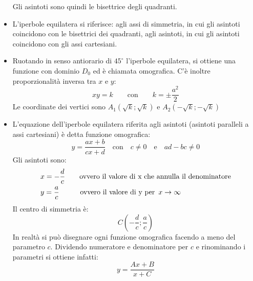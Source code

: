 \documentclass[]{article}
\begin{document}
\begin{itemize}
		Gli asintoti sono quindi le bisettrice degli quadranti.
	\item L'iperbole equilatera si riferisce: agli assi di simmetria, in cui gli asintoti coincidono con le bisettrici dei quadranti, agli asintoti, in cui gli asintoti coincidono con gli assi cartesiani.
	\item Ruotando in senso antiorario di $45^{\circ}$ l'iperbole equilatera, si ottiene una funzione con dominio $D_0$ ed è chiamata omografica. C'è inoltre proporzionalità inversa tra $x$ e $y$:
		$$xy=k \hspace{2em} \text{con} \hspace{2em} k=\pm\frac{a^2}{2}$$
		Le coordinate dei vertici sono $A_1(\sqrt{k};\sqrt{k})$ e $A_2(-\sqrt{k};-\sqrt{k})$
	\item L'equazione dell'iperbole equilatera riferita agli asintoti (asintoti paralleli a assi cartesiani) è detta funzione omografica:
		$$y=\frac{ax+b}{cx+d} \hspace {1em} \text{con} \hspace{1em} c\neq0 \hspace{1em} \text{e} \hspace{1em} ad-bc\neq0$$
		Gli asintoti sono:
		\begin{align*}
			&\null x=-\frac{d}{c} \hspace{2em} \text{ovvero il valore di x che annulla il denominatore}\\
			&\null y=\frac{a}{c} \hspace{2.9em} \text{ovvero il valore di y per} \hspace{0.5em} x\to\infty
		\end{align*}
		Il centro di simmetria è:
		$$C(-\frac{d}{c};\frac{a}{c})$$
		In realtà si può disegnare ogni funzione omografica facendo a meno del parametro $c$. Dividendo numeratore e denominatore per $c$ e rinominando i parametri si ottiene infatti:
		$$y=\frac{Ax+B}{x+C}$$

\end{itemize}
\end{document}
